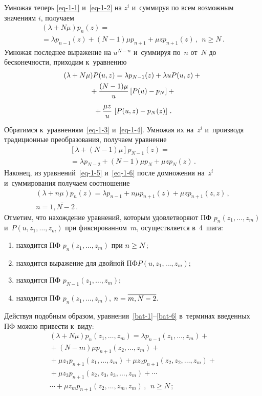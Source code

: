 \begin{multicols}{2}
Умножая теперь \eqref{eq-1-1} и~\eqref{eq-1-2} на $z^i$ 
и~суммируя по всем возможным значениям $i$, получаем
\begin{multline*}
(\lambda+N\mu) p_{n}(z) = {}\\
{}=\lambda p_{n-1}(z) + (N-1) \mu p_{n+1} 
+
\mu z p_{n+1}(z) \,,\ \ n\ge N\,.
\end{multline*}
Умножая последнее выражение
на $u^{N-n}$ и~суммируя по~$n$ от~$N$ до бесконечности, приходим к~уравнению
\begin{multline}
\label{eq-z-2}
(\lambda+N\mu) P(u,z) = \lambda p_{N-1}(z) +
\lambda u P(u,z) + {}\\
{}+\displaystyle\frac{\displaystyle (N-1) \mu\mathstrut}{\displaystyle u\mathstrut} \left[P(u) - p_{N}\right]
+ {}\\
{}+\displaystyle\frac{\displaystyle \mu z \mathstrut}{\displaystyle u\mathstrut}\, \left[P(u,z)-p_{N}(z)\right] \,.
\end{multline}
Обратимся к~уравнениям~\eqref{eq-1-3} и~\eqref{eq-1-4}.
Умножая их на~$z^i$ и~производя традиционные преобразования, получаем уравнение
\begin{multline}
\label{eq-z-3}
[\lambda+(N-1)\mu] p_{N-1}(z) ={}\\
{}= \lambda p_{N-2} +
(N-1)\mu p_{N} + \mu z p_N(z)\,.
\end{multline}
Наконец, из уравнений~\eqref{eq-1-5} и~\eqref{eq-1-6}
после домножения на~$z^i$ и~суммирования получаем соотношение
\begin{multline}
\label{eq-z-4}
(\lambda+n\mu) p_{n}(z) = \lambda p_{n-1}+ n\mu p_{n+1}(z)+
\mu z p_{n+1}(z,z) \,,\\ 
n=\overline{1,N-2}\,.
\end{multline}
Отметим, что нахождение уравнений, которым удовле\-тво\-ря\-ют ПФ $p_{n}(z_1,\ldots,z_m)$ 
и~$P(u,z_1,\ldots,z_m)$ при фиксированном~$m$, осуществляется в~4~шага:
\begin{enumerate}[(1)]
\item находится ПФ $p_{n}(z_1,\ldots,z_{m})$ при $n \hm\ge N$;
\item находится выражение для двойной $ПФ P(u,z_1,\ldots,z_m)$;
\item находится ПФ $p_{N-1}(z_1,\ldots,z_{m})$; 
\item находится ПФ $p_{n}(z_1,\ldots,z_{m})$, $n\hm=\overline{m,N-2}$.
\end{enumerate}
 Действуя подобным образом, уравнения~\eqref{bat-1}--\eqref{bat-6} в~терминах введенных ПФ
 можно привести к~виду:
 \begin{multline*}
(\lambda+N\mu) p_{n}\left(z_1,\ldots,z_{m}\right) =
\lambda p_{n-1}\left(z_1,\ldots,z_{m}\right) +{}\\
{}+
(N-m) \mu p_{n+1}(z_2,\ldots,z_{m}) +{}
\\
{}+
\mu z_1 p_{n+1}\left(z_1,\ldots,z_{m}\right) +
\mu z_2 p_{n+1}\left(z_2,z_2,\ldots,z_{m}\right) +{}\\
{}+
\mu z_3 p_{n+1}\left(z_2,z_3,z_3,\ldots,z_{m}\right) + \cdots{}\\
{}\cdots + \mu z_m p_{n+1}\left(z_2,\ldots,z_{m},z_{m}\right)\,,\ \ n\ge N\,;
\end{multline*}


\end{multicols}
